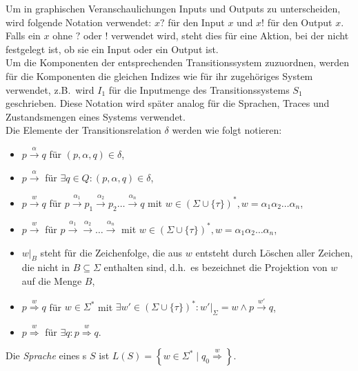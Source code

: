Um in graphischen Veranschaulichungen Inputs und Outputs zu unterscheiden, wird
folgende Notation verwendet: $x?$ für den Input $x$ und $x!$ für den Output
$x$. Falls ein $x$ ohne $?$ oder $!$ verwendet wird, steht dies für eine
Aktion, bei der nicht festgelegt ist, ob sie ein Input oder ein Output ist.\\
Um die Komponenten der entsprechenden Transitionssystem zuzuordnen, werden für
die Komponenten die gleichen Indizes wie für ihr zugehöriges System verwendet,
z.B.\ wird $I_1$ für die Inputmenge des Transitionssystems $S_1$ geschrieben. Diese
Notation wird später analog für die Sprachen, Traces und Zustandsmengen eines
Systems verwendet.\\
Die Elemente der Transitionsrelation $\delta$ werden wie folgt notieren:
\begin{itemize}
  \item $p\overset{\alpha}{\rightarrow} q$ für $(p,\alpha ,q)\in\delta$,
  \item $p\overset{\alpha}{\rightarrow}$ für $\exists q \in Q: (p,\alpha ,q)\in\delta$,
  \item $p\overset{w}{\rightarrow} q$ für $p \overset{\alpha _1}{\longrightarrow}
    p_1 \overset{\alpha _2}{\longrightarrow} p_2\dots \overset{\alpha
    _n}{\longrightarrow} q$ mit $w\in \left(\Sigma\cup\{\tau\}\right)^*, w=\alpha _1\alpha
    _2\dots \alpha _n$,
  \item $p\overset{w}{\rightarrow}$ für $p \overset{\alpha _1}{\longrightarrow}
    \overset{\alpha _2}{\longrightarrow} \dots \overset{\alpha _n}{\longrightarrow}$
    mit $w\in \left(\Sigma\cup\{\tau\}\right)^*, w=\alpha _1\alpha _2\dots \alpha _n$,
  \item $w|_B$ steht für die Zeichenfolge, die aus $w$ entsteht durch Löschen
    aller Zeichen, die nicht in $B\subseteq\Sigma$ enthalten sind, d.h.\ es
    bezeichnet die Projektion von $w$ auf die Menge $B$,
  \item $p\overset{w}{\Rightarrow} q$ für $w\in\Sigma^*$ mit $\exists
    w'\in\left(\Sigma\cup\{\tau\}\right)^*:w'|_{\Sigma}=w\wedge p\overset{w'}{\rightarrow}
    q$,
  \item $p\overset{w}{\Rightarrow}$ für $\exists q:p\overset{w}{\Rightarrow}
    q$.
\end{itemize}
Die \emph{Sprache} eines \EIO{}s $S$ ist
$L(S)=\left\{w\in\Sigma^*\mid q_0\overset{w}{\Rightarrow}\right\}$.

